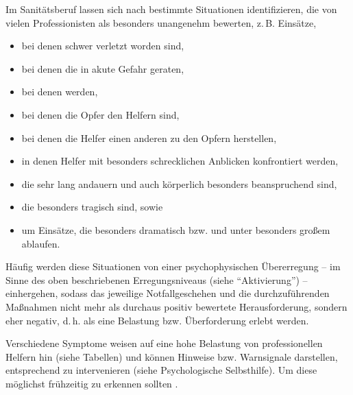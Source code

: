 \Text
{{\TxBeschreibung}}%
{%
Im Sanitätsberuf lassen sich nach 
bestimmte Situationen identifizieren, die von vielen Professionisten als besonders unangenehm
bewerten, z.\,B. Einsätze,
\begin{itemize}
  \item bei denen  schwer verletzt worden sind,
  \item bei denen die  in akute Gefahr
  geraten,
  \item bei denen 
  werden,
  \item bei denen die Opfer den Helfern  sind,
  \item bei denen die Helfer einen anderen  zu den Opfern herstellen,
  \item in denen Helfer mit besonders schrecklichen
  Anblicken konfrontiert werden,
  \item die sehr lang andauern und auch körperlich besonders
  beanspruchend sind,
  \item die besonders tragisch sind, sowie
  \item um Einsätze, die besonders dramatisch bzw.
   und unter besonders großem 
  ablaufen.
\end{itemize}

Häufig werden diese Situationen von einer psychophysischen
Übererregung -- im Sinne des oben beschriebenen
Erregungsniveaus (siehe \enquote{Aktivierung}) -- einhergehen,
sodass das jeweilige Notfallgeschehen und die durchzuführenden
Maßnahmen nicht mehr als durchaus positiv bewertete
Herausforderung, sondern eher negativ, d.\,h. als eine
Belastung bzw. Überforderung erlebt werden.
}%



{
Verschiedene Symptome weisen auf eine hohe Belastung von
professionellen Helfern hin (siehe Tabellen) und können
Hinweise bzw. Warnsignale darstellen, entsprechend zu
intervenieren (siehe Psychologische Selbsthilfe). Um diese
möglichst frühzeitig zu erkennen sollten
.}
{}
{}
{}
{}





